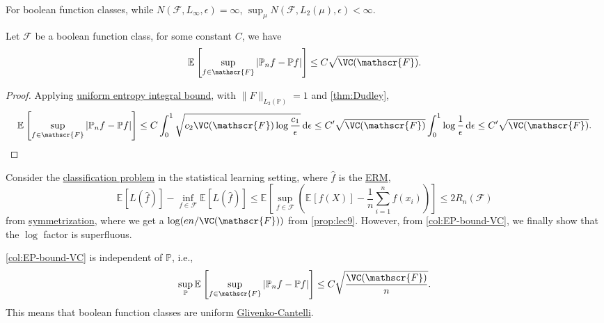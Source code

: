 \begin{remark}
	For boolean function classes, while \(N(\mathscr{F} , L_\infty , \epsilon ) = \infty \), \(\sup _\mu N(\mathscr{F} , L_2(\mu ), \epsilon ) < \infty \).
\end{remark}

\begin{corollary}\label{col:EP-bound-VC}
	Let \(\mathscr{F} \) be a boolean function class, for some constant \(C\), we have
	\[
		\mathbb{E}_{}\left[\sup _{f\in \mathscr{F} } \vert \mathbb{P} _n f - \mathbb{P} f \vert \right]
		\leq C \sqrt{\VC(\mathscr{F} )} .
	\]
\end{corollary}
\begin{proof}
	Applying \hyperref[thm:uniform-entropy-integral-bound]{uniform entropy integral bound}, with \(\lVert F \rVert _{L_2(\mathbb{P} )} = 1\) and \autoref{thm:Dudley},
	\[
		\mathbb{E}_{}\left[\sup _{f\in \mathscr{F} } \vert \mathbb{P} _n f - \mathbb{P} f \vert \right]
		\leq C \int_{0}^{1} \sqrt{c_2 \VC(\mathscr{F} ) \log \frac{c_1}{\epsilon }}  \,\mathrm{d}\epsilon
		\leq C^{\prime} \sqrt{\VC(\mathscr{F} )} \int_{0}^{1} \log \frac{1}{\epsilon } \,\mathrm{d}\epsilon
		\leq C^{\prime} \sqrt{\VC(\mathscr{F} )} .
	\]
\end{proof}

\begin{remark}
	Consider the \hyperref[eg:1D-classification-thresholds]{classification problem} in the statistical learning setting, where \(\hat{f} \) is the \hyperref[prb:ERM]{ERM},
	\[
		\mathbb{E}_{}\left[L(\hat{f} ) \right] - \inf _{f\in \mathscr{F} } \mathbb{E}_{}\left[L(\hat{f} ) \right]
		\leq \mathbb{E}_{}\left[\sup _{f\in \mathscr{F} } \left( \mathbb{E}_{}\left[f(X) \right] - \frac{1}{n}\sum_{i=1}^{n} f(x_i) \right) \right]
		\leq 2R_n(\mathscr{F} )
	\]
	from \hyperref[lma:symmetrization]{symmetrization}, where we get a \(\log (en / \VC(\mathscr{F} ))\) from \autoref{prop:lec9}. However, from \autoref{col:EP-bound-VC}, we finally show that the \(\log \) factor is superfluous.
\end{remark}


\begin{remark}
	\autoref{col:EP-bound-VC} is independent of \(\mathbb{P} \), i.e.,
	\[
		\sup _{\mathbb{P} } \mathbb{E}_{}\left[\sup _{f\in \mathscr{F}} \vert \mathbb{P} _n f - \mathbb{P} f \vert  \right] \leq C \sqrt{\frac{\VC(\mathscr{F} )}{n}} .
	\]
	This means that boolean function classes are uniform \hyperref[def:Glivenko-Cantelli]{Glivenko-Cantelli}.
\end{remark}

